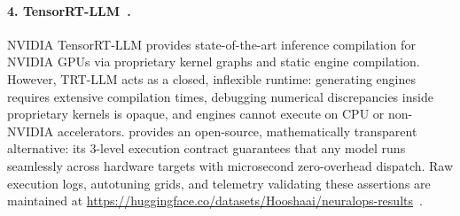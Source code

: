 \paragraph{4. TensorRT-LLM~\cite{nvidia2023tensorrtllm}.}
NVIDIA TensorRT-LLM provides state-of-the-art inference compilation for NVIDIA GPUs via proprietary kernel graphs and static engine compilation. However, TRT-LLM acts as a closed, inflexible runtime: generating engines requires extensive compilation times, debugging numerical discrepancies inside proprietary kernels is opaque, and engines cannot execute on CPU or non-NVIDIA accelerators. \neuralops{} provides an open-source, mathematically transparent alternative: its 3-level execution contract guarantees that any model runs seamlessly across hardware targets with microsecond zero-overhead dispatch. Raw execution logs, autotuning grids, and telemetry validating these assertions are maintained at \url{https://huggingface.co/datasets/Hooshaai/neuralops-results}~\cite{neuralops_results_hf}.
